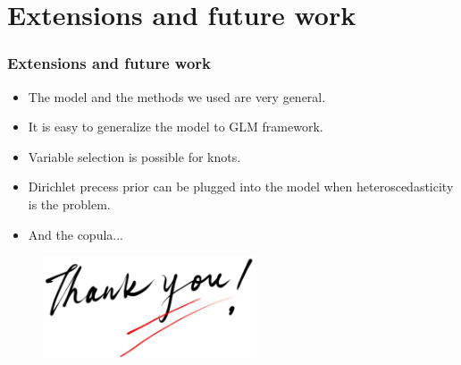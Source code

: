 \documentclass[10pt]{beamer}
\begin{document}
\section{Extensions and future work}
\begin{frame}
  \frametitle{Extensions and future work}
  \begin{itemize}
  \item The model and the methods we used are very general.
  \item It is easy to generalize the model to GLM framework.
  \item Variable selection is possible for knots.
  \item Dirichlet precess prior can be plugged into the model when
    heteroscedasticity is the problem.
  \item And the copula...
  \end{itemize}
\end{frame}

\begin{frame}[plain]
  \begin{center}
    \begin{figure}
      \includegraphics[height=3.0cm]{thankyou.png}
    \end{figure}
  \end{center}
\end{frame}
\end{document}
